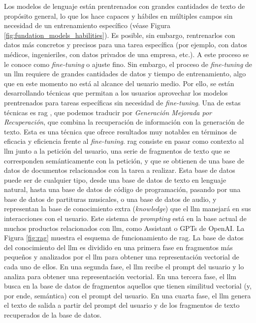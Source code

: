 Los modelos de lenguaje están prentrenados con grandes cantidades de texto de propósito general, lo que los hace capaces y hábiles en múltiples campos sin necesidad de un entrenamiento específico (véase Figura \ref{fig:fundation_models_habilities}). Es posible, sin embargo, rentrenarlos con datos más concretos y precisos para una tarea específica (por ejemplo, con datos médicos, ingenieriles, con datos privados de una empresa, etc.). A este proceso se le conoce como \emph{fine-tuning} o ajuste fino. Sin embargo, el proceso de \emph{fine-tuning} de un \gls{llm} requiere de grandes cantidades de datos y tiempo de entrenamiento, algo que en este momento no está al alcance del usuario medio. Por ello, se están desarrollando técnicas que permitan a los usuarios aprovechar los modelos prentrenados para tareas específicas sin necesidad de \emph{fine-tuning}. Una de estas técnicas es \gls{rag} \citep{WhatRetrievalaugmentedGeneration2021}, que podemos traducir por \emph{Generación Mejorada por Recuperación}, que combina la recuperación de información con la generación de texto. Esta es una técnica que ofrece resultados muy notables en términos de eficacia y eficiencia frente al \emph{fine-tuning}. \gls{rag} consiste en pasar como contexto al \gls{llm} junto a la petición del usuario, una serie de fragmentos de texto que se corresponden semánticamente con la petición, y que se obtienen de una base de datos de documentos relacionados con la tarea a realizar. Esta base de datos puede ser de cualquier tipo, desde una base de datos de texto en lenguaje natural, hasta una base de datos de código de programación, pasando por una base de datos de partituras musicales, o una base de datos de audio, y representan la base de conocimiento extra (\emph{knowledge}) que el \gls{llm} manejará en sus interacciones con el usuario. Este sistema de \emph{prompting} está en la base actual de muchos productos relacionados con \gls{llm}, como Assistant o GPTs de OpenAI. La Figura \ref{fig:rag} muestra el esquema de funcionamiento de \gls{rag}. La base de datos del conocimiento del \gls{llm} es dividido en una primera fase en fragmentos más pequeños y analizados por el \gls{llm} para obtener una representación vectorial de cada uno de ellos. En una segunda fase, el \gls{llm} recibe el {prompt} del usuario y lo analiza para obtener una representación vectorial. En una tercera fase, el \gls{llm} busca en la base de datos de fragmentos aquellos que tienen similitud vectorial (y, por ende, semántica) con el {prompt} del usuario. En una cuarta fase, el \gls{llm} genera el texto de salida a partir del {prompt} del usuario y de los fragmentos de texto recuperados de la base de datos. 



